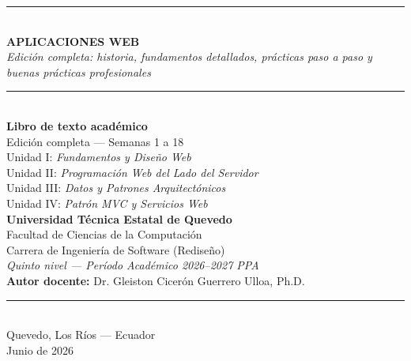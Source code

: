 \documentclass[11pt,a4paper,openany]{book}
\begin{document}
\frontmatter

\begin{titlepage}
\centering\vspace*{1cm}
{\color{uteqverde}\rule{\linewidth}{2pt}}\\[0.6cm]
{\Huge\bfseries\color{uteqverde} APLICACIONES WEB}\\[0.4cm]
{\Large\itshape Edición completa: historia, fundamentos detallados, prácticas paso a paso y buenas prácticas profesionales}\\[0.3cm]
{\color{uteqverde}\rule{\linewidth}{1pt}}\\[1.2cm]
{\Large\bfseries Libro de texto académico}\\[0.3cm]
{\large Edición completa --- Semanas 1 a 18}\\[0.5cm]
{\large Unidad I: \emph{Fundamentos y Diseño Web}}\\
{\large Unidad II: \emph{Programación Web del Lado del Servidor}}\\
{\large Unidad III: \emph{Datos y Patrones Arquitectónicos}}\\
{\large Unidad IV: \emph{Patrón MVC y Servicios Web}}\\[1.6cm]
{\large\bfseries Universidad Técnica Estatal de Quevedo}\\
{\large Facultad de Ciencias de la Computación}\\
{\large Carrera de Ingeniería de Software (Rediseño)}\\[0.7cm]
{\large\itshape Quinto nivel --- Período Académico 2026--2027 PPA}\\[1.5cm]
{\large \textbf{Autor docente:} Dr. Gleiston Cicerón Guerrero Ulloa, Ph.D.}\\[1.8cm]
{\color{uteqdorado}\rule{\linewidth}{2pt}}\\[0.4cm]
{\large Quevedo, Los Ríos --- Ecuador}\\
{\large Junio de 2026}
\end{titlepage}
\end{document}
